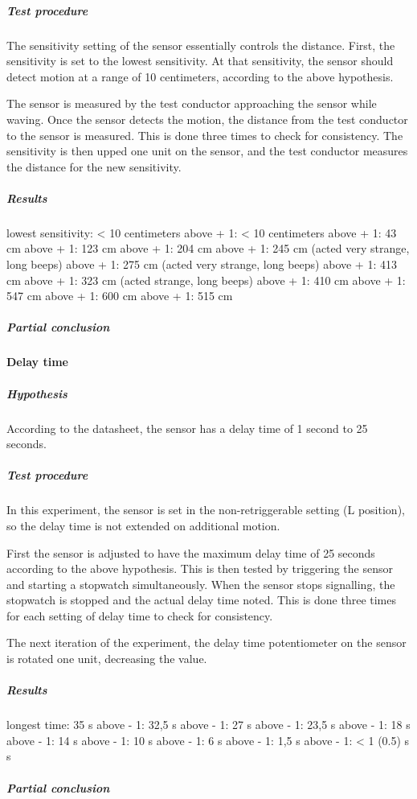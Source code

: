 \subparagraph{Test procedure}

The sensitivity setting of the sensor essentially controls the distance. First,
the sensitivity is set to the lowest sensitivity. At that sensitivity, the
sensor should detect motion at a range of 10 centimeters, according to the above
hypothesis.

The sensor is measured by the test conductor approaching the sensor while
waving. Once the sensor detects the motion, the distance from the test conductor
to the sensor is measured. This is done three times to check for consistency. The sensitivity is then upped one unit on the sensor,
and the test conductor measures the distance for the new sensitivity.

\subparagraph{Results}

lowest sensitivity: < 10 centimeters
above + 1: < 10 centimeters
above + 1: 43 cm
above + 1: 123 cm
above + 1: 204 cm
above + 1: 245 cm (acted very strange, long beeps)
above + 1: 275 cm (acted very strange, long beeps)
above + 1: 413 cm
above + 1: 323 cm (acted strange, long beeps)
above + 1: 410 cm
above + 1: 547 cm
above + 1: 600 cm
above + 1: 515 cm


\subparagraph{Partial conclusion}


\paragraph{Delay time}

\subparagraph{Hypothesis}

According to the datasheet, the sensor has a delay time of 1 second to 25 seconds.

\subparagraph{Test procedure}

In this experiment, the sensor is set in the non-retriggerable setting (L
position), so the delay time is not extended on additional motion.

First the sensor is adjusted to have the maximum delay time of 25 seconds
according to the above hypothesis. This is then tested by triggering the sensor
and starting a stopwatch simultaneously. When the sensor stops signalling, the
stopwatch is stopped and the actual delay time noted. This is done three times
for each setting of delay time to check for consistency.

The next iteration of the experiment, the delay time potentiometer on the sensor
is rotated one unit, decreasing the value.

\subparagraph{Results}

longest time: 35 s
above - 1: 32,5 s
above - 1: 27 s
above - 1: 23,5 s
above - 1: 18 s
above - 1: 14 s
above - 1: 10 s
above - 1: 6 s
above - 1: 1,5 s
above - 1: < 1 (0.5) s s

\subparagraph{Partial conclusion}
